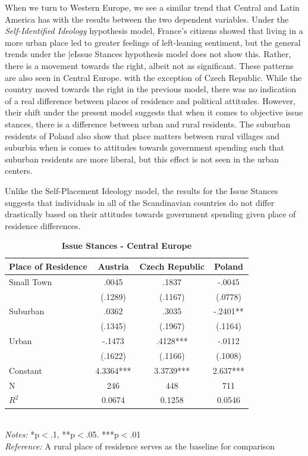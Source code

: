 \documentclass[12pt, titlepage]{article}
\newcommand\e{\emph}
\newcommand\tb{\textbf}
\begin{document}
When we turn to Western Europe, we see a similar trend that Central and Latin America has with the results between the two dependent variables. Under the \e{Self-Identified Ideology} hypothesis model, France's citizens showed that living in a more urban place led to greater feelings of left-leaning sentiment, but the general trends under the |e{Issue Stances} hypothesis model does not show this. Rather, there is a movement towards the right, albeit not as significant. These patterns are also seen in Central Europe. with the exception of Czech Republic. While the country moved towards the right in the previous model, there was no indication of a real difference between places of residence and political attitudes. However, their shift under the present model suggests that when it comes to objective issue stances, there is a difference between urban and rural residents. The suburban residents of Poland also show that place matters between rural villages and suburbia when is comes to attitudes towards government spending such that suburban residents are more liberal, but this effect is not seen in the urban centers.

Unlike the Self-Placement Ideology model, the results for the Issue Stances suggests that individuals in all of the Scandinavian countries do not differ drastically based on their attitudes towards government spending given place of residence differences. 

\begin{singlespace}
	\begin{table}[H]
		\centering
		\caption{\tb{Issue Stances - Central Europe}}
		\begin{tabulary}{\linewidth}{l c c c }
			
			\hline
			\tb{Place of Residence} &\tb{Austria}&\tb{Czech Republic}& \tb{Poland} \\
			\hline
			Small Town &.0045 &.1837  &-.0045   \\
			&(.1289)&(.1167) &(.0778)  \\
			Suburban& .0362 &.3035  &-.2401**   \\
			&(.1345) &(.1967) &(.1164)\\
			Urban&-.1473&.4128***  &-.0112    \\
			&(.1622)& (.1166)  &(.1008)    \\
			Constant&4.3364*** &3.3739***  &2.637***     \\
			N&246 & 448  & 711   \\
			$R^2$&0.0674&0.1258  &0.0546  \\
			\hline 
\end{tabulary}
\\
\e{Notes:} *p$<$.1, **p$<$.05. ***p$<$.01 \\
\e{Reference:} A rural place of residence serves as the baseline for comparison
\label{CELib}
\end{table}
\end{singlespace}
\end{document}
